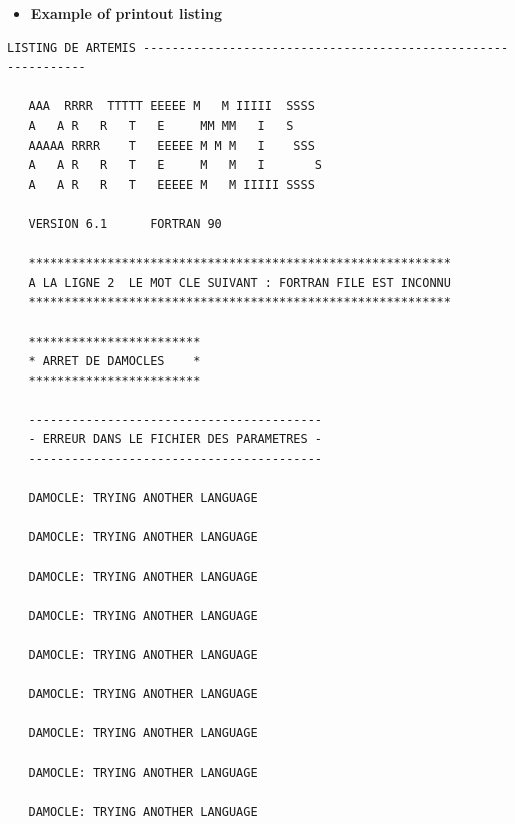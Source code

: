 \begin{itemize}
\item  \textbf{Example of printout listing}
\end{itemize}

\begin{verbatim}
LISTING DE ARTEMIS --------------------------------------------------------------

   AAA  RRRR  TTTTT EEEEE M   M IIIII  SSSS
   A   A R   R   T   E     MM MM   I   S
   AAAAA RRRR    T   EEEEE M M M   I    SSS
   A   A R   R   T   E     M   M   I       S
   A   A R   R   T   EEEEE M   M IIIII SSSS

   VERSION 6.1      FORTRAN 90

   ***********************************************************
   A LA LIGNE 2  LE MOT CLE SUIVANT : FORTRAN FILE EST INCONNU
   ***********************************************************

   ************************
   * ARRET DE DAMOCLES    *
   ************************

   -----------------------------------------
   - ERREUR DANS LE FICHIER DES PARAMETRES -
   -----------------------------------------

   DAMOCLE: TRYING ANOTHER LANGUAGE

   DAMOCLE: TRYING ANOTHER LANGUAGE

   DAMOCLE: TRYING ANOTHER LANGUAGE

   DAMOCLE: TRYING ANOTHER LANGUAGE

   DAMOCLE: TRYING ANOTHER LANGUAGE

   DAMOCLE: TRYING ANOTHER LANGUAGE

   DAMOCLE: TRYING ANOTHER LANGUAGE

   DAMOCLE: TRYING ANOTHER LANGUAGE

   DAMOCLE: TRYING ANOTHER LANGUAGE


\end{verbatim}
